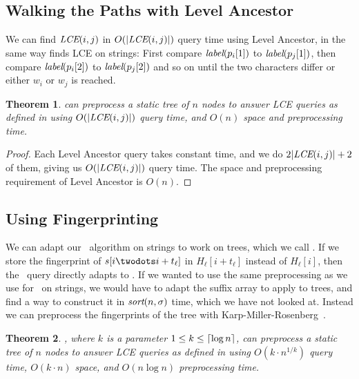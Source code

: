 \documentclass[a4]{article}
\newcommand*{\pref}{\prettyref}
\newtheorem{theorem}{Theorem}
\begin{document}
\subsection{Walking the Paths with Level Ancestor\label{sec:tree-dc}}

We can find $\textit{LCE}(i,j)$ in $O(|\textit{LCE}(i,j)|)$ query time using Level Ancestor, in the same way  finds LCE on strings: First compare $\textit{label}(p_i[1])$ to $\textit{label}(p_j[1])$, then compare $\textit{label}(p_i[2])$ to $\textit{label}(p_j[2])$ and so on until the two characters differ or either $w_i$ or $w_j$ is reached.

\begin{theorem}
 can preprocess a static tree of $n$ nodes to answer LCE queries as defined in \pref{sec:tree-def} using $O(|\textit{LCE}(i,j)|)$ query time, and $O(n)$ space and preprocessing time.
\end{theorem}
\begin{proof}
Each Level Ancestor query takes constant time, and we do $2|\textit{LCE}(i,j)| + 2$ of them, giving us $O(|\textit{LCE}(i,j)|)$ query time. The space and preprocessing requirement of Level Ancestor is $O(n)$.
\end{proof}

\subsection{Using Fingerprinting}

We can adapt our \fprintk\ algorithm on strings to work on trees, which we call \tfprintk. If we store the fingerprint of $s[i\twodots i+t_\ell]$ in $H_\ell[i+t_\ell]$ instead of $H_\ell[i]$, then the \fprintk\ query directly adapts to \tfprintk. If we wanted to use the same preprocessing as we use for \fprintk\ on strings, we would have to adapt the suffix array to apply to trees, and find a way to construct it in $\textit{sort}(n,\sigma)$ time, which we have not looked at. Instead we can preprocess the fingerprints of the tree with Karp-Miller-Rosenberg~\cite{karp-miller-rosenberg}.

\begin{theorem}
\tfprintk, where $k$ is a parameter $1\leq k\leq\lceil\log n\rceil$, can preprocess a static tree of $n$ nodes to answer LCE queries as defined in \pref{sec:tree-def} using $O(k\cdot n^{1/k})$ query time, $O(k\cdot n)$ space, and $O(n\log n)$ preprocessing time.
\end{theorem}
\end{document}

